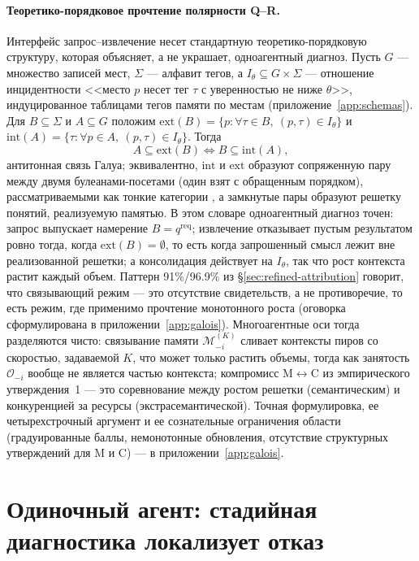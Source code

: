 \documentclass{article}
\begin{document}
\paragraph{Теоретико-порядковое прочтение полярности Q--R.}
Интерфейс запрос--извлечение несет стандартную теоретико-порядковую структуру, которая объясняет, а не украшает, одноагентный диагноз. Пусть $G$ --- множество записей мест, $\Sigma$ --- алфавит тегов, а $I_\theta \subseteq G\times\Sigma$ --- отношение инцидентности <<место $p$ несет тег $\tau$ с уверенностью не ниже $\theta$>>, индуцированное таблицами тегов памяти по местам (приложение~\ref{app:schemas}). Для $B\subseteq\Sigma$ и $A\subseteq G$ положим $\mathrm{ext}(B)=\{p : \forall\tau\in B,\ (p,\tau)\in I_\theta\}$ и $\mathrm{int}(A)=\{\tau : \forall p\in A,\ (p,\tau)\in I_\theta\}$. Тогда
\[
A \subseteq \mathrm{ext}(B) \iff B \subseteq \mathrm{int}(A),
\]
антитонная связь Галуа; эквивалентно, $\mathrm{int}$ и $\mathrm{ext}$ образуют сопряженную пару между двумя булеанами-посетами (один взят с обращенным порядком), рассматриваемыми как тонкие категории \citep{ganter1999fca,maclane1998categories}, а замкнутые пары образуют решетку понятий, реализуемую памятью. В этом словаре одноагентный диагноз точен: запрос выпускает намерение $B = q^{\mathrm{req}}$; извлечение отказывает пустым результатом ровно тогда, когда $\mathrm{ext}(B)=\emptyset$, то есть когда запрошенный смысл лежит вне реализованной решетки; а консолидация действует на $I_\theta$, так что рост контекста растит каждый объем. Паттерн 91\%/96.9\% из \S\ref{sec:refined-attribution} говорит, что связывающий режим --- это отсутствие свидетельств, а не противоречие, то есть режим, где применимо прочтение монотонного роста (оговорка сформулирована в приложении~\ref{app:galois}). Многоагентные оси тогда разделяются чисто: связывание памяти $\mathcal{M}^{(K)}_{-i}$ сливает контексты пиров со скоростью, задаваемой $K$, что может только растить объемы, тогда как занятость $\mathcal{O}_{-i}$ вообще не является частью контекста; компромисс M$\leftrightarrow$C из эмпирического утверждения~1 --- это соревнование между ростом решетки (семантическим) и конкуренцией за ресурсы (экстрасемантической). Точная формулировка, ее четырехстрочный аргумент и ее сознательные ограничения области (градуированные баллы, немонотонные обновления, отсутствие структурных утверждений для M и C) --- в приложении~\ref{app:galois}.

\section{Одиночный агент: стадийная диагностика локализует отказ}
\label{sec:single}
\end{document}
